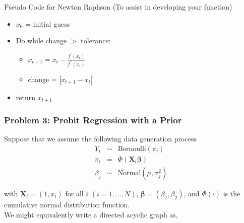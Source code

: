 \documentclass[12pt,letterpaper]{article}
\begin{document}
\begin{table}[hbt!]
\caption{Pseudo Code for Newton Raphson (To assist in developing your function)}
\begin{itemize}
\item $x_{0}$ = initial guess
\item Do while change $>$ tolerance:
\begin{itemize}
\item[] $x_{t+1}  = x_{t} - \frac{f^{'}(x_{t})}{f^{''}(x_{t} ) } $
\item[] change = $| x_{t+1} - x_{t}|$ 
\end{itemize}
\item return $x_{t+1}$
\end{itemize}
\end{table}


\subsubsection*{Problem 3: Probit Regression with a Prior}

Suppose that we assume the following data generation process
\begin{eqnarray}
Y_{i} & \sim & \text{Bernoulli}(\pi_{i} ) \nonumber \\
\pi_{i} & = & \Phi(\boldsymbol{X}_{i} \boldsymbol{\beta}) \nonumber \\
\beta_{j} & \sim & \text{Normal}(\mu, \sigma^{2}_{j} )\nonumber 
\end{eqnarray}

with $\boldsymbol{X}_{i} = (1, x_{i})$ for all $i$ $(i = 1, \hdots, N)$,  $\boldsymbol{\beta} = (\beta_{1}, \beta_{2})$, and $\Phi(\cdot)$ is the cumulative normal distribution function.  \\

We might equivalently write a directed acyclic graph as, 

\vspace{0.25in}

\begin{large}
\end{large}
\end{document}

